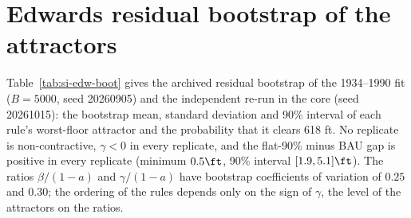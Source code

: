 \section{Edwards residual bootstrap of the attractors}\label{si:edw-boot}
Table~\ref{tab:si-edw-boot} gives the archived residual bootstrap of the 1934--1990 fit ($B=5000$, seed 20260905) and the independent re-run in the core (seed 20261015): the bootstrap mean, standard deviation and 90\% interval of each rule's worst-floor attractor and the probability that it clears 618 ft. No replicate is non-contractive, $\gamma<0$ in every replicate, and the flat-90\% minus BAU gap is positive in every replicate (minimum $0.5\ft$, 90\% interval $[1.9,5.1]\ft$). The ratios $\beta/(1-a)$ and $\gamma/(1-a)$ have bootstrap coefficients of variation of $0.25$ and $0.30$; the ordering of the rules depends only on the sign of $\gamma$, the level of the attractors on the ratios.

